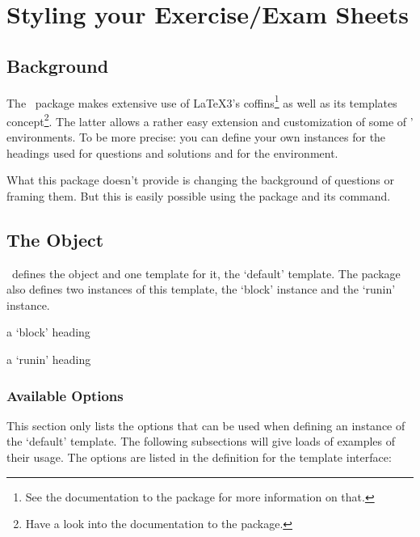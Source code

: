 \documentclass[load-preamble+,scrartcl={DIV10}]{cnltx-doc}
\begin{document}
\section{Styling your Exercise/Exam Sheets}\label{part:style}
\subsection{Background}
The \ExSheets\ package makes extensive use of \LaTeX3's coffins\footnote{See
  the documentation to the  package for more information on
  that.} as well as its templates concept\footnote{Have a look into the
  documentation to the  package.}.  The latter allows a
rather easy extension and customization of some of \ExSheets' environments.
To be more precise: you can define your own instances for the headings used
for questions and solutions and for the  environment.

What this package doesn't provide is changing the background of questions or
framing them.  But this is easily possible using the  package
and its  command.

\subsection{The  Object}\label{sec:exsheets-headings}
\ExSheets\ defines the object  and one template for it,
the `default' template.  The package also defines two instances of this
template, the `block' instance and the `runin' instance.

\begin{example}
  \begin{question}{1}
    a `block' heading
  \end{question}
  \begin{question}{1}
    a `runin' heading
  \end{question}
\end{example}

\subsubsection{Available Options}
This section only lists the options that can be used when defining an instance
of the `default' template.  The following subsections will give loads of
examples of their usage.  The options are listed in the definition for the
template interface:
\end{document}
